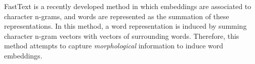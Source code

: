 FastText is a recently developed method \cite{bojanowski2016enriching,joulin2016bag} in which embeddings are associated to character n-grams, and words are represented as the summation of these representations. In this method, a word representation is induced by summing character n-gram vectors with vectors of surrounding words. Therefore, this method attempts to capture \emph{morphological} information to induce word embeddings.


